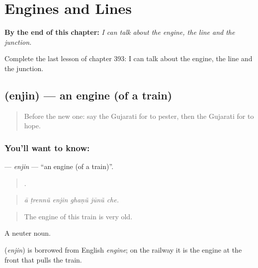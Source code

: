 
\chapter{Engines and Lines}
\label{ch:gu-engines-and-lines}

\begin{chapteropening}
\textbf{By the end of this chapter:} \emph{I can talk about the engine, the line and the junction.}

Complete the last lesson of chapter 393: I can talk about the engine, the line and the junction.
\end{chapteropening}

\section[\texorpdfstring{\gu{એન્જિન} (enjin)}{એન્જિન (enjin)}]{ (enjin) — an engine (of a train)}

\label{lesson:GU-C393-enjin}



\begin{quote}
Before the new one: say the Gujarati for to pester, then the Gujarati for to hope.
\end{quote}

\subsection*{You'll want to know: }
\textbf{} — \emph{enjin} — \textquotedblleft{}an engine (of a train)\textquotedblright{}.

\begin{quote}
     .
\end{quote}

\begin{quote}
\emph{ā ṭrennũ enjin ghaṇũ jūnũ che.}
\end{quote}

\begin{quote}
The engine of this train is very old.
\end{quote}

A neuter noun.

\begin{cousinweb}
\textbf{} (\emph{enjin}) is borrowed from English \emph{engine}; on the railway it is the engine at the front that pulls the train.
\end{cousinweb}

